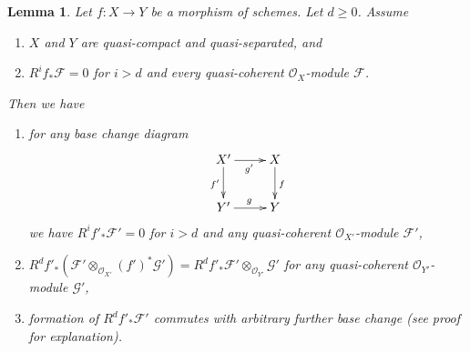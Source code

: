 \documentclass{stacks-project}
\theoremstyle{plain}
\newtheorem{lemma}[subsection]{Lemma}
\theoremstyle{definition}
\theoremstyle{remark}
\numberwithin{equation}{subsection}
\begin{document}
\begin{lemma}
\label{lemma-top-cohomology-functor}
Let $f : X \to Y$ be a morphism of schemes. Let $d \geq 0$. Assume
\begin{enumerate}
\item $X$ and $Y$ are quasi-compact and quasi-separated, and
\item $R^if_*\mathcal{F} = 0$ for $i > d$ and
every quasi-coherent $\mathcal{O}_X$-module $\mathcal{F}$.
\end{enumerate}
Then we have
\begin{enumerate}
\item[(a)] for any base change diagram
$$
\xymatrix{
X' \ar[d]_{f'} \ar[r]_{g'} & X \ar[d]^f \\
Y' \ar[r]^g & Y
}
$$
we have $R^if'_*\mathcal{F}' = 0$ for $i > d$ and any quasi-coherent
$\mathcal{O}_{X'}$-module $\mathcal{F}'$,
\item[(b)]
$R^df'_*(\mathcal{F}' \otimes_{\mathcal{O}_{X'}} (f')^*\mathcal{G}') =
R^df'_*\mathcal{F}' \otimes_{\mathcal{O}_{Y'}} \mathcal{G}'$
for any quasi-coherent $\mathcal{O}_{Y'}$-module $\mathcal{G}'$,
\item[(c)] formation of $R^df'_*\mathcal{F}'$ commutes with arbitrary
further base change (see proof for explanation).
\end{enumerate}
\end{lemma}
\end{document}
